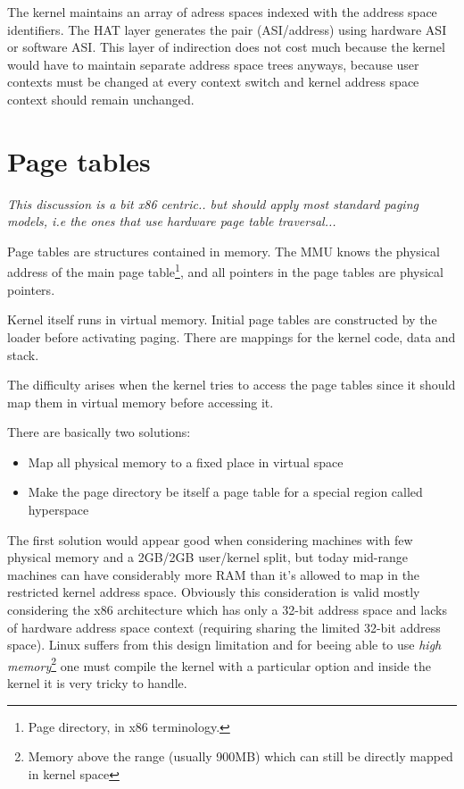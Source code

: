 The kernel maintains an array of adress spaces indexed with the address space identifiers.
The HAT layer generates the pair (ASI/address) using hardware ASI or software ASI.
 This layer of indirection does not cost much because the kernel would have
to maintain separate address space trees anyways, because user contexts must be 
changed at every context switch and kernel address space context should remain unchanged.

\section{Page tables}

\emph{This discussion is a bit x86 centric.. but should apply most standard paging
  models, i.e the ones that use hardware page table traversal...}

Page tables are structures contained in memory. The MMU knows the physical address of the 
main page table\footnote{Page directory, in x86 terminology.}, and all pointers in the page
tables are physical pointers.

Kernel itself runs in virtual memory. Initial page tables are constructed by the loader
before activating paging. There are mappings for the kernel code, data and stack.

The difficulty arises when the kernel tries to access the page tables since it should
map them in virtual memory before accessing it.

There are basically two solutions:

\begin{itemize}
\item Map all physical memory to a fixed place in virtual space
\item Make the page directory be itself a page table for a special region called hyperspace
\end{itemize}

The first solution would appear good when considering machines with few physical memory
and a 2GB/2GB user/kernel split, but today mid-range machines can have considerably more RAM
than it's allowed to map in the restricted kernel address space. Obviously this consideration
is valid mostly considering the x86 architecture which has only a 32-bit address space and 
lacks of hardware address space context (requiring sharing the limited 32-bit address space).
 Linux suffers from this design limitation and for beeing able to use 
\emph{high memory}\footnote{Memory above the range (usually 900MB) which can still be directly mapped in kernel space} one must compile the kernel with a particular option and inside the kernel it is very tricky to handle.

